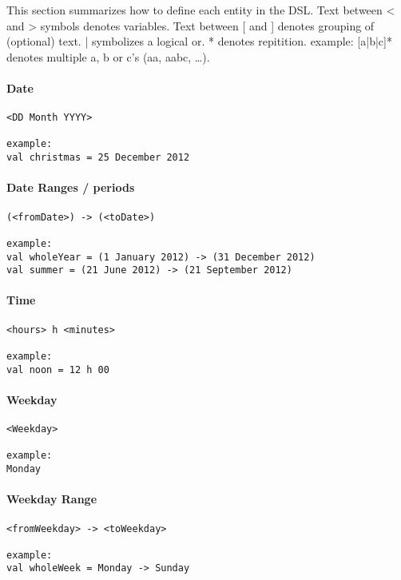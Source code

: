 This section summarizes how to define each entity in the DSL.
Text between < and > symbols denotes variables.
Text between [ and ] denotes grouping of (optional) text. | symbolizes a logical or. * denotes repitition.
example: [a|b|c]* denotes multiple a, b or c's (aa, aabc, \dots).

\paragraph{Date}\hfill
\begin{lstlisting}
<DD Month YYYY>

example:
val christmas = 25 December 2012
\end{lstlisting}
		
\paragraph{Date Ranges / periods}\hfill
\begin{lstlisting}
(<fromDate>) -> (<toDate>)

example:
val wholeYear = (1 January 2012) -> (31 December 2012)
val summer = (21 June 2012) -> (21 September 2012)
\end{lstlisting}
		
\paragraph{Time}\hfill
\begin{lstlisting}
<hours> h <minutes>

example:
val noon = 12 h 00
\end{lstlisting}

\paragraph{Weekday}\hfill
\begin{lstlisting}
<Weekday>

example:
Monday
\end{lstlisting}
	    
\paragraph{Weekday Range}\hfill
\begin{lstlisting}
<fromWeekday> -> <toWeekday>

example:
val wholeWeek = Monday -> Sunday
\end{lstlisting}

